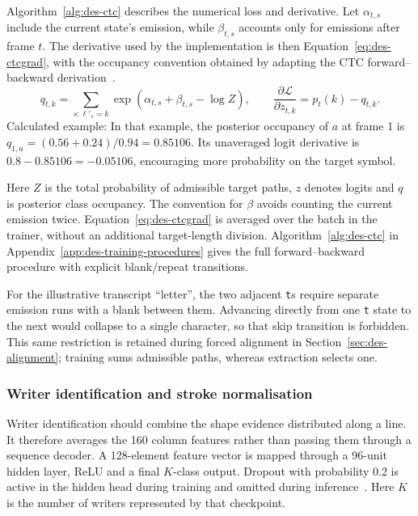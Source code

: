 Algorithm~\ref{alg:des-ctc} describes the numerical loss and derivative. Let $\alpha_{t,s}$ include the current state's emission, while $\beta_{t,s}$ accounts only for emissions after frame $t$. The derivative used by the implementation is then Equation~\ref{eq:des-ctcgrad}, with the occupancy convention obtained by adapting the CTC forward--backward derivation~\cite[PDF pp.~5--6]{graves2006}.
\begin{equation}
q_{t,k}=\sum_{s:\ell'_s=k}\exp(\alpha_{t,s}+\beta_{t,s}-\log Z),
\qquad \frac{\partial\mathcal L}{\partial z_{t,k}}=p_t(k)-q_{t,k}.
\label{eq:des-ctcgrad}
\end{equation}
Calculated example: In that example, the posterior occupancy of $a$ at frame 1 is $q_{1,a}=(0.56+0.24)/0.94=0.85106$. Its unaveraged logit derivative is $0.8-0.85106=-0.05106$, encouraging more probability on the target symbol. \cite[train.py, CtcLoss]{braunepipeline2026}

Here $Z$ is the total probability of admissible target paths, $z$ denotes logits and $q$ is posterior class occupancy. The convention for $\beta$ avoids counting the current emission twice. Equation~\ref{eq:des-ctcgrad} is averaged over the batch in the trainer, without an additional target-length division.
Algorithm~\ref{alg:des-ctc} in Appendix~\ref{app:des-training-procedures} gives the full forward--backward procedure with explicit blank/repeat transitions.~\cite[recognise.py; train.py]{braunepipeline2026}


For the illustrative transcript ``letter'', the two adjacent \texttt{t}s require separate emission runs with a blank between them. Advancing directly from one \texttt{t} state to the next would collapse to a single character, so that skip transition is forbidden. This same restriction is retained during forced alignment in Section~\ref{sec:des-alignment}; training sums admissible paths, whereas extraction selects one.~\cite[recognise.py; train.py; trainlibrary.py]{braunepipeline2026}

\subsubsection{Writer identification and stroke normalisation}
\label{sec:des-shapenamer}
Writer identification should combine the shape evidence distributed along a line. It therefore averages the 160 column features rather than passing them through a sequence decoder. A 128-element feature vector is mapped through a 96-unit hidden layer, ReLU and a final $K$-class output. Dropout with probability 0.2 is active in the hidden head during training and omitted during inference~\cite[pp.~1931, 1934]{srivastava2014}. Here $K$ is the number of writers represented by that checkpoint.


